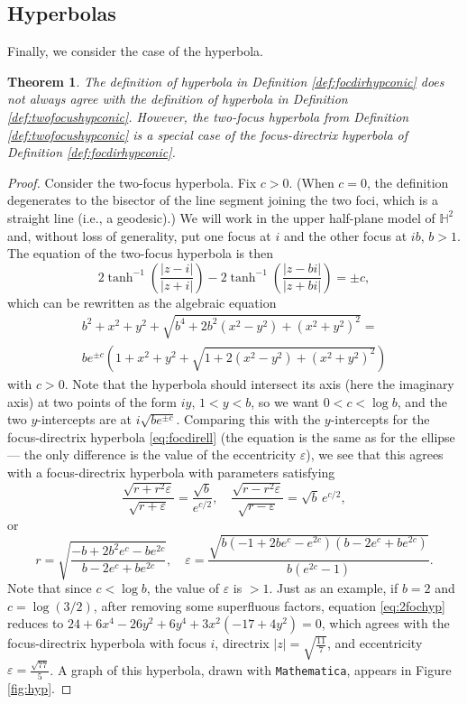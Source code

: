 \documentclass[12pt]{amsart}
\newtheorem{theorem}{Theorem}
\theoremstyle{definition}
\begin{document}
\subsection{Hyperbolas}
\label{sec:hyperbola}
Finally, we consider the case of the hyperbola.
\begin{theorem}
\label{thm:twohyps}
The definition of hyperbola in Definition \ref{def:focdirhypconic} does
\emph{not always} agree with the definition of hyperbola in Definition
\ref{def:twofocushypconic}.  However, the two-focus hyperbola
from Definition \ref{def:twofocushypconic} is a special case of
the focus-directrix hyperbola of Definition \ref{def:focdirhypconic}.
\end{theorem}
\begin{proof}
Consider the two-focus hyperbola. Fix $c>0$.
(When $c=0$, the definition degenerates to the bisector of the line
segment joining the two foci, which is a straight line (i.e., a geodesic).)
We will work in the upper half-plane model of ${\mathbb H}^2$ and, without
loss of generality, put one focus at $i$ and the other focus at $ib$, $b>1$.
The equation of the two-focus hyperbola is then
\[
2\tanh^{-1}\left({\frac{|z-i|}{|z+i|}}\right) -
2\tanh^{-1}\left({\frac{|z-bi|}{|z+bi|}}\right) = \pm c,
\]
which can be rewritten as the algebraic equation
\begin{multline}
  \label{eq:2fochyp}
b^2 + x^2 + y^2 + \sqrt{b^4 + 2 b^2 (x^2 - y^2) + (x^2 + y^2)^2} =\\
b e^{\pm c} \left(1 + x^2 + y^2 + \sqrt{1 + 2 (x^2 - y^2)
  + (x^2 + y^2)^2}\right)  
\end{multline}
with $c>0$.  Note that the hyperbola should intersect its axis
(here the imaginary axis) at two points of the form $iy$, $1< y < b$,
so we want $0 < c < \log b$, and the two $y$-intercepts are at
$i\sqrt{be^{\pm c}}$.  Comparing this with the $y$-intercepts for the
focus-directrix hyperbola \eqref{eq:focdirell} (the equation is the
same as for the ellipse --- the only difference is the value of the
eccentricity $\varepsilon$), we see that this agrees with a
focus-directrix hyperbola with parameters satisfying
\[
\frac{\sqrt{r + r^2 \varepsilon}}{\sqrt{r + \varepsilon}} =
\frac{\sqrt{b}}{e^{c/2}}, \quad \frac{\sqrt{r - r^2\varepsilon}}
     {\sqrt{r - \varepsilon}} = \sqrt{b}\,e^{c/2},
     \]
or
\begin{equation}
r =\sqrt{\frac{-b + 2 b^2 e^c - b e^{2 c}}
  {b - 2 e^c + b e^{2 c}}},\quad  \varepsilon =
\frac{\sqrt{b (-1 + 2 b e^c - e^{2 c})(b - 2 e^c + b e^{2 c})}}
     {b(e^{2c}-1)}.
\label{eq:revals}
\end{equation}
Note that since $c < \log b$, the value of $\varepsilon$ is $>1$.
Just as an example, if $b=2$ and $c = \log(3/2)$, after removing some
superfluous factors, equation \eqref{eq:2fochyp} reduces to
$24 + 6 x^4 - 26 y^2 + 6 y^4 + 3 x^2 (-17 + 4 y^2) = 0$, which
agrees with the focus-directrix hyperbola with focus $i$, directrix
$|z|=\sqrt{\frac{11}{7}}$, and eccentricity $\varepsilon=\frac{\sqrt{77}}{5}$.
A graph of this hyperbola, drawn with \texttt{Mathematica}, appears in Figure
\ref{fig:hyp}.


\end{proof}
\end{document}

